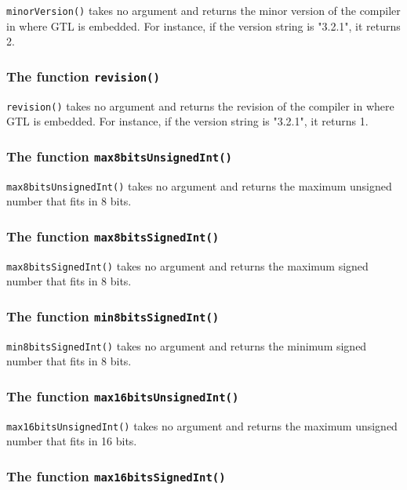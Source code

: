 \documentclass[10pt,openright,twosides,final]{memoir}
\newcommand{\icst}[1]{{\footnotesize\ttfamily\colorbox{light-blue}{#1}}}
\newcommand{\scst}[1]{{\footnotesize\ttfamily\colorbox{light-blue}{"#1"}}}
\newcommand{\gtlinline}[1]{\colorbox{light-blue}{\lstinline[language=gtl]{#1}}}
\begin{document}
\gtlinline{minorVersion()} takes no argument and returns the minor version of the compiler in where GTL is embedded. For instance, if the version string is \scst{3.2.1}, it returns \icst{2}.

\subsubsection{The function \texttt{revision()}}

\gtlinline{revision()} takes no argument and returns the revision of the compiler in where GTL is embedded. For instance, if the version string is \scst{3.2.1}, it returns \icst{1}.

\subsubsection{The function \texttt{max8bitsUnsignedInt()}}

\gtlinline{max8bitsUnsignedInt()} takes no argument and returns the maximum unsigned number that fits in 8 bits.

\subsubsection{The function \texttt{max8bitsSignedInt()}}

\gtlinline{max8bitsSignedInt()} takes no argument and returns the maximum signed number that fits in 8 bits.

\subsubsection{The function \texttt{min8bitsSignedInt()}}

\gtlinline{min8bitsSignedInt()} takes no argument and returns the minimum signed number that fits in 8 bits.

\subsubsection{The function \texttt{max16bitsUnsignedInt()}}

\gtlinline{max16bitsUnsignedInt()} takes no argument and returns the maximum unsigned number that fits in 16 bits.

\subsubsection{The function \texttt{max16bitsSignedInt()}}
\end{document}
